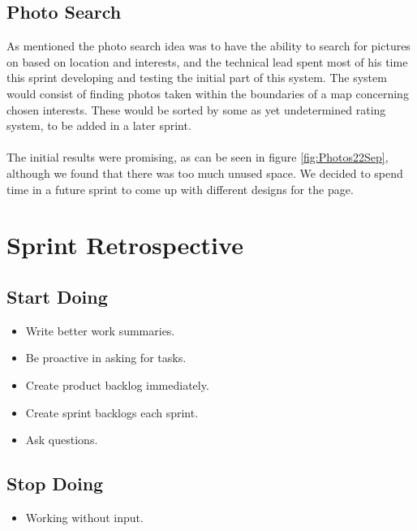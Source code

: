 \subsection*{Photo Search}
As mentioned the photo search idea was to have the ability to search for pictures on based on location and interests, and the technical lead spent most of his time this sprint developing and testing the initial part of this system. The system would consist of finding photos taken within the boundaries of a map concerning chosen interests. These would be sorted by some as yet undetermined rating system, to be added in a later sprint.
\paragraph*{} The initial results were promising, as can be seen in figure \ref{fig:Photos22Sep}, although we found that there was too much unused space. We decided to spend time in a future sprint to come up with different designs for the page.

\section{Sprint Retrospective}
\label{sec:S1Retrospective}

\subsection{Start Doing}
\label{subsec:S1RetrospectiveStart}

\begin{itemize}
  \item Write better work summaries.
  \item Be proactive in asking for tasks.
  \item Create product backlog immediately.
  \item Create sprint backlogs each sprint.
  \item Ask questions.
\end{itemize}

\subsection{Stop Doing}
\label{subsec:S1RetrospectiveStop}

\begin{itemize}
  \item Working without input.
\end{itemize}


